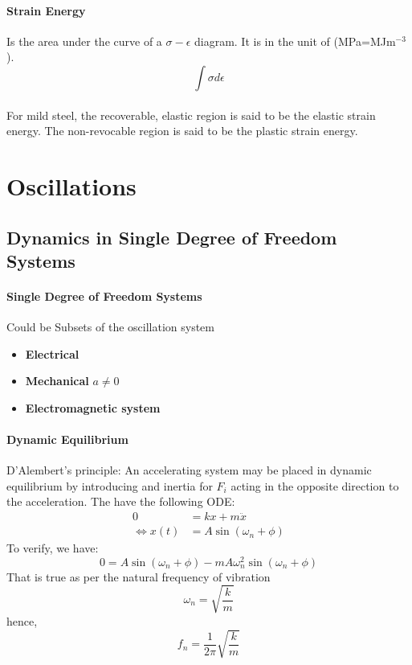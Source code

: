 \paragraph{Strain Energy} Is the area under the curve of a $\sigma-\epsilon$ diagram. It is in the unit of (MPa=MJm$^{-3}$).
\begin{equation}
    \int \sigma d\epsilon
\end{equation}
\paragraph{} For mild steel, the recoverable, elastic region is said to be the elastic strain energy. The non-revocable region is said to be the plastic strain energy.
\section{Oscillations}
\subsection{Dynamics in Single Degree of Freedom Systems}
\paragraph{Single Degree of Freedom Systems} Could be Subsets of the oscillation system
\begin{itemize}
    \item \textbf{Electrical}
    \item \textbf{Mechanical} $a\neq0$
    \item \textbf{Electromagnetic system}
\end{itemize}
\paragraph{Dynamic Equilibrium} D'Alembert's principle: An accelerating system may be placed in dynamic equilibrium by introducing and inertia for $F_i$ acting in the opposite direction to the acceleration. The have the following ODE:
\begin{align}
    0&=kx+m\ddot{x}\\\nonumber
    \Leftrightarrow x(t)&=A\sin(\omega_n+\phi)
\end{align} 
To verify, we have:
\begin{equation*}
    0 = A\sin(\omega_n+\phi)- mA\omega_n^2\sin(\omega_n+\phi)
\end{equation*}
That is true as per the natural frequency of vibration
\begin{equation}
    \omega_n=\sqrt{\frac{k}{m}}
\end{equation}
hence,
\begin{equation}
    f_n = \frac{1}{2\pi}\sqrt{\frac{k}{m}}
\end{equation}
